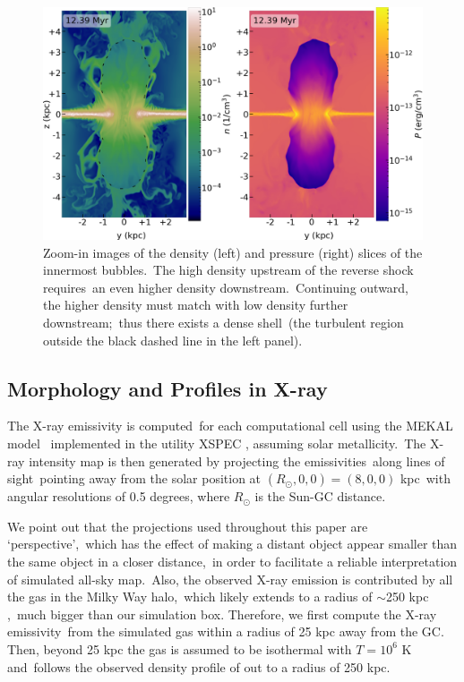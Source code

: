 \documentclass[fleqn,usenatbib,useAMS]{mnras}
\begin{document}
  \begin{figure}
    \includegraphics[width=\columnwidth]{figures/fig__innerbubbles.png}
    \caption{
       Zoom-in images of the density (left) and pressure (right) slices of the innermost bubbles.\
       The high density upstream of the reverse shock requires\
       an even higher density downstream.\
       Continuing outward, the higher density must match with low density further downstream;\
       thus there exists a dense shell\
       (the turbulent region outside the black dashed line in the left panel).
     }
    \label{fig__innerbubbles}
  \end{figure}

  \subsection{Morphology and Profiles in X-ray}
  \label{X-ray}
  The X-ray emissivity is computed\
  for each computational cell
  using the MEKAL model \citep{Xray-1,Xray-2,Xray-3}\
  implemented in the utility XSPEC \citep{XSPEC}, assuming solar metallicity.\
  The X-ray intensity map is then generated by projecting the emissivities\
  along lines of sight\
  pointing away from the solar position at $(R_{\odot},0,0)=(8,0,0)$ kpc\
  with angular resolutions of 0.5 degrees, where $R_{\odot}$ is the Sun-GC distance.

  We point out that the projections used throughout this paper are \lq perspective\rq,\
  which has the effect of making a distant object appear smaller than the same object in a closer distance,\
  in order to facilitate a reliable interpretation of simulated all-sky map.\
  Also, the observed X-ray emission is contributed by all the gas in the Milky Way halo,\
  which likely extends to a radius of $\sim$250 kpc \citep{halo-radius-1,halo-radius-2},\
  much bigger than our simulation box. Therefore, we first compute the X-ray emissivity\
  from the simulated gas within a radius of 25 kpc away from the GC.
  Then, beyond 25 kpc the gas is assumed to be isothermal with $T=10^6$ K and\
  follows the observed density profile of \citep{temperature-MW} out to a radius of 250 kpc.
\end{document}

